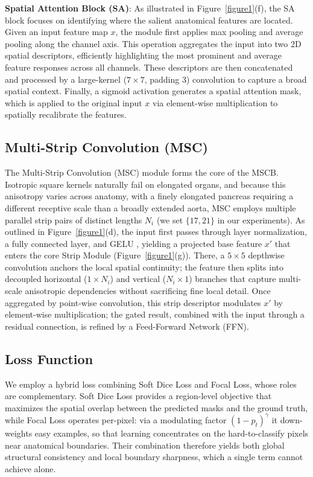 \documentclass{llncs}
\begin{document}
\textbf{Spatial Attention Block (SA)}\cite{woo2018cbam}: As illustrated in Figure~\ref{figure1}(f), the SA block focuses on identifying where the salient anatomical features are located. Given an input feature map $x$, the module first applies max pooling and average pooling along the channel axis. This operation aggregates the input into two 2D spatial descriptors, efficiently highlighting the most prominent and average feature responses across all channels. These descriptors are then concatenated and processed by a large-kernel ($7\times7$, padding 3) convolution to capture a broad spatial context. Finally, a sigmoid activation generates a spatial attention mask, which is applied to the original input $x$ via element-wise multiplication to spatially recalibrate the features.

\subsection{Multi-Strip Convolution (MSC)}

The Multi-Strip Convolution (MSC) module \cite{chu2021active,hou2020strip,liu2023slak} forms the core of the MSCB. Isotropic square kernels naturally fail on elongated organs, and because this anisotropy varies across anatomy, with a finely elongated pancreas requiring a different receptive scale than a broadly extended aorta, MSC employs multiple parallel strip pairs of distinct lengths $N_i$ (we set $\{17, 21\}$ in our experiments). As outlined in Figure~\ref{figure1}(d), the input first passes through layer normalization, a fully connected layer, and GELU \cite{hendrycks2016gelu}, yielding a projected base feature $x'$ that enters the core Strip Module (Figure~\ref{figure1}(g)). There, a $5\times5$ depthwise convolution anchors the local spatial continuity; the feature then splits into decoupled horizontal ($1\times N_i$) and vertical ($N_i\times1$) branches that capture multi-scale anisotropic dependencies without sacrificing fine local detail. Once aggregated by point-wise convolution, this strip descriptor modulates $x'$ by element-wise multiplication; the gated result, combined with the input through a residual connection, is refined by a Feed-Forward Network (FFN).

\subsection{Loss Function}
\label{sec:loss}

We employ a hybrid loss combining Soft Dice Loss and Focal Loss, whose roles are complementary. Soft Dice Loss provides a region-level objective that maximizes the spatial overlap between the predicted masks and the ground truth, while Focal Loss operates per-pixel: via a modulating factor $(1-p_t)^\gamma$ it down-weights easy examples, so that learning concentrates on the hard-to-classify pixels near anatomical boundaries. Their combination therefore yields both global structural consistency and local boundary sharpness, which a single term cannot achieve alone.
\end{document}
